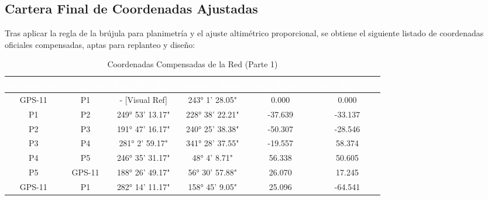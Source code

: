 \documentclass[11pt,letterpaper]{article}
\begin{document}
\subsection{Cartera Final de Coordenadas Ajustadas}
Tras aplicar la regla de la brújula para planimetría y el ajuste altimétrico proporcional, se obtiene el siguiente listado de coordenadas oficiales compensadas, aptas para replanteo y diseño:
\begin{table}[H]
  \centering
  \small
  \caption{Coordenadas Compensadas de la Red (Parte 1)}
  \label{tab:ajuste_0}
  \begin{tabular}{|c|c|c|c|c|c|}
    \hline
    \rowcolor{GeoBlue}
    \textcolor{white}{\textbf{Estacionado}} & \textcolor{white}{\textbf{Pto\_Obs}} & \textcolor{white}{\textbf{Ang\_Hz\_Ajus}} & \textcolor{white}{\textbf{Azimut\_Línea}} & \textcolor{white}{\textbf{Dep\_Ajus (E)}} & \textcolor{white}{\textbf{Lat\_Ajus (N)}} \\
    \hline
    \rowcolor{GeoBlue!5}
    GPS-11 & P1 & - [Visual Ref] & 243° 1' 28.05" & 0.000 & 0.000 \\
    \hline
    \rowcolor{white}
    P1 & P2 & 249° 53' 13.17" & 228° 38' 22.21" & -37.639 & -33.137 \\
    \hline
    \rowcolor{GeoBlue!5}
    P2 & P3 & 191° 47' 16.17" & 240° 25' 38.38" & -50.307 & -28.546 \\
    \hline
    \rowcolor{white}
    P3 & P4 & 281° 2' 59.17" & 341° 28' 37.55" & -19.557 & 58.374 \\
    \hline
    \rowcolor{GeoBlue!5}
    P4 & P5 & 246° 35' 31.17" & 48° 4' 8.71" & 56.338 & 50.605 \\
    \hline
    \rowcolor{white}
    P5 & GPS-11 & 188° 26' 49.17" & 56° 30' 57.88" & 26.070 & 17.245 \\
    \hline
    \rowcolor{GeoBlue!5}
    GPS-11 & P1 & 282° 14' 11.17" & 158° 45' 9.05" & 25.096 & -64.541 \\
    \hline
  \end{tabular}
\end{table}
\vspace{0.8cm}
\end{document}
